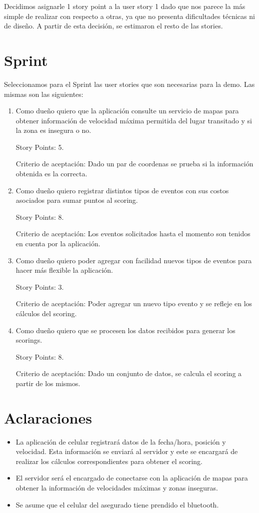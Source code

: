 Decidimos asignarle 1 story point a la user story 1 dado que nos parece la más simple de realizar con respecto a otras, ya que no presenta dificultades técnicas ni de diseño. A partir de esta decisión, se estimaron el resto de las stories.

\section{Sprint}

Seleccionamos para el Sprint las user stories que son necesarias para la demo. 
Las mismas son las siguientes:
\begin{enumerate}
\item Como dueño quiero que la aplicación consulte un servicio de mapas para obtener información de velocidad máxima permitida del lugar transitado y si la zona es insegura o no. 

Story Points: 5.

Criterio de aceptación: Dado un par de coordenas se prueba si la información obtenida es la correcta.

\item Como dueño quiero registrar distintos tipos de eventos con sus costos asociados para sumar puntos al scoring. 

Story Points: 8.

Criterio de aceptación: Los eventos solicitados hasta el momento son tenidos en cuenta por la aplicación.

\item Como dueño quiero poder agregar con facilidad nuevos tipos de eventos para hacer más flexible la 
aplicación. 

Story Points: 3.

Criterio de aceptación: Poder agregar un nuevo tipo evento y se refleje en los cálculos del scoring.

\item Como dueño quiero que se procesen los datos recibidos para generar los scorings.

Story Points: 8.

Criterio de aceptación: Dado un conjunto de datos, se calcula el scoring a partir de los mismos.

\end{enumerate}

\section{Aclaraciones}
\begin{itemize}
\item La aplicación de celular registrará datos de la fecha/hora, posición y velocidad. Esta información se enviará al servidor y este se encargará de realizar los cálculos correspondientes para obtener el scoring.
\item El servidor será el encargado de conectarse con la aplicación de mapas para obtener la información de velocidades máximas y zonas inseguras.
\item Se asume que el celular del asegurado tiene prendido el bluetooth.
\end{itemize}
